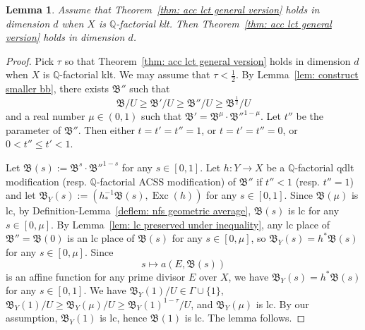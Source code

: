 \documentclass[11pt,reqno]{amsart}
\numberwithin{equation}{section}
\newcommand{\Exc}{\operatorname{Exc}}
\newcommand{\Bb}{{\mathfrak{B}}}
\newcommand{\Ii}{\Gamma}
\newtheorem{lem}[thm]{Lemma}
\theoremstyle{definition}
\begin{document}
\begin{lem}\label{lem: acc reduce to klt}
    Assume that Theorem~\ref{thm: acc lct general version} holds in dimension $d$ when $X$ is $\mathbb Q$-factorial klt. Then Theorem~\ref{thm: acc lct general version} holds in dimension $d$.
\end{lem}
\begin{proof}
Pick $\tau$ so that Theorem~\ref{thm: acc lct general version} holds in dimension $d$ when $X$ is $\mathbb Q$-factorial klt. We may assume that $\tau<\frac{1}{2}$. By Lemma~\ref{lem: construct smaller bb}, there exists $\Bb''$ such that
$$\Bb/U\geq\Bb'/U\geq\Bb''/U\geq\Bb^{\frac{1}{2}}/U$$
and a real number $\mu\in (0,1)$ such that $\Bb'=\Bb^\mu\cdot\Bb''^{1-\mu}$. Let $t''$ be the parameter of $\Bb''$. Then either $t=t'=t''=1$, or $t=t'=t''=0$, or $0<t''\leq t'<1$. 

Let $\Bb(s):=\Bb^s\cdot\Bb''^{1-s}$ for any $s\in [0,1]$.
Let $h\colon Y\rightarrow X$ be a $\mathbb Q$-factorial qdlt modification (resp. $\mathbb Q$-factorial ACSS modification) of $\Bb''$ if $t''<1$ (resp. $t''=1$) and let $\Bb_Y(s):=(h^{-1}_*\Bb(s),\Exc(h))$ for any $s\in [0,1]$. Since $\Bb(\mu)$ is lc, by Definition-Lemma~\ref{deflem: nfs geometric average}, $\Bb(s)$ is lc for any $s\in [0,\mu]$. By Lemma~\ref{lem: lc preserved under inequality}, any lc place of $\Bb''=\Bb(0)$ is an lc place of $\Bb(s)$ for any $s\in [0,\mu]$, so $\Bb_Y(s)=h^*\Bb(s)$ for any $s\in [0,\mu]$. Since 
$$s\mapsto a(E,\Bb(s))$$
is an affine function for any prime divisor $E$ over $X$, we have $\Bb_Y(s)=h^*\Bb(s)$ for any $s\in [0,1]$. We have $\Bb_Y(1)/U\in\Ii\cup\{1\}$,
$\Bb_Y(1)/U\geq\Bb_Y(\mu)/U\geq\Bb_Y(1)^{1-\tau}/U$, and $\Bb_Y(\mu)$ is lc. By our assumption, $\Bb_Y(1)$ is lc, hence $\Bb(1)$ is lc. The lemma follows.
\end{proof}
\end{document}
